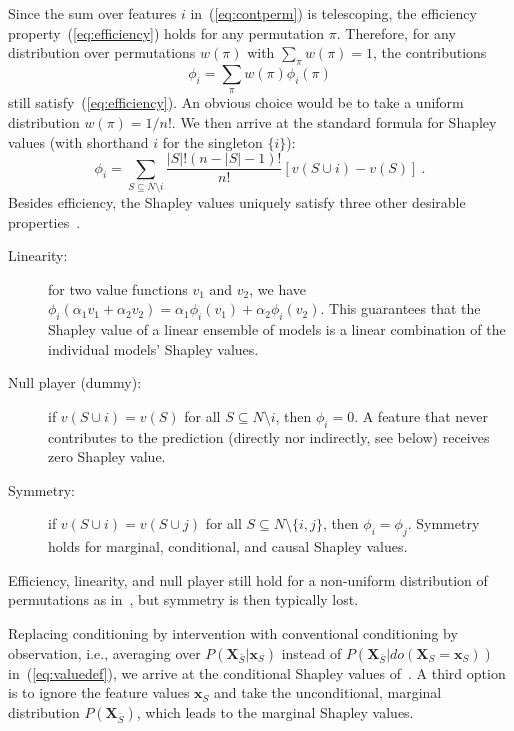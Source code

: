 \documentclass{article}
\newcommand{\vX}{\mathbf{X}}
\newcommand{\vx}{\mathbf{x}}
\newcommand{\contribution}{{\phi}}
\newcommand{\val}{{v}}
\newcommand{\dodo}{\mathit{do}}
\newcommand{\lvdo}[1]{\dodo(\vX_{#1} = \vx_{#1})}
\newcommand{\perm}{\pi}
\newcommand{\allfeatures}{{N}}
\begin{document}
Since the sum over features $i$ in~(\ref{eq:contperm}) is telescoping, the efficiency property~(\ref{eq:efficiency}) holds for any permutation $\perm$. Therefore, for any distribution over permutations $w(\perm)$ with $\sum_{\perm} w(\perm) = 1$, the contributions
\begin{equation}
\contribution_i = \sum_{\perm} w(\perm) \contribution_i(\perm)
\label{eq:shapperm}
\end{equation}
still satisfy~(\ref{eq:efficiency}). An obvious choice would be to take a uniform distribution $w(\perm) = 1/n!$. We then arrive at the standard formula for Shapley values (with shorthand $i$ for the singleton $\{i\}$):
\[
\contribution_i = \sum_{S \subseteq \allfeatures\setminus i} \frac{|S|! (n-|S|-1)!}{n!} \left[\val(S \cup i) - \val(S) \right] \: .
\]
Besides efficiency, the Shapley values uniquely satisfy three other desirable properties~\cite{shapley1953value}.
\begin{description}
	\item[Linearity:] for two value functions $\val_1$ and $\val_2$, we have $\contribution_i(\alpha_1 \val_1 + \alpha_2 \val_2) = \alpha_1 \contribution_i(\val_1) + \alpha_2 \contribution_i(\val_2)$. This guarantees that the Shapley value of a linear ensemble of models is a linear combination of the individual models' Shapley values.
	\item[Null player (dummy):] if $\val(S \cup i) = \val(S)$ for all $S \subseteq \allfeatures \setminus i$, then $\contribution_i = 0$. A feature that never contributes to the prediction (directly nor indirectly, see below) receives zero Shapley value.
	\item[Symmetry:] if $\val(S \cup i) = \val(S \cup j)$ for all  $S \subseteq \allfeatures \setminus \{i,j\}$, then $\contribution_i = \contribution_j$. Symmetry holds for marginal, conditional, and causal Shapley values.
\end{description}
Efficiency, linearity, and null player still hold for a non-uniform distribution of permutations as in~\cite{frye2019asymmetric}, but symmetry is then typically lost.

Replacing conditioning by intervention with conventional conditioning by observation, i.e., averaging over $P(\vX_{\bar{S}}|\vx_{S})$ instead of $P(\vX_{\bar{S}}|\lvdo{S})$ in~(\ref{eq:valuedef}), we arrive at the conditional Shapley values of~\cite{aas2019explaining,lundberg2018consistent}. A third option is to ignore the feature values $\vx_S$ and take the unconditional, marginal distribution $P(\vX_{\bar{S}})$, which leads to the marginal Shapley values.
\end{document}
